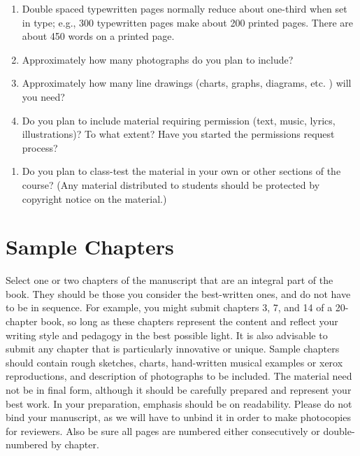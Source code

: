 \documentclass[10pt,dvipsnames,enabledeprecatedfontcommands]{scrartcl}
\providecommand{\tightlist}{%
  \setlength{\itemsep}{0pt}\setlength{\parskip}{0pt}}
\begin{document}
\begin{enumerate}
\def\labelenumi{\alph{enumi}.}
\item
  Double spaced typewritten pages normally reduce about one-third when
  set in type; e.g., 300 typewritten pages make about 200 printed pages.
  There are about 450 words on a printed page.
\item
  Approximately how many photographs do you plan to include?
\item
  Approximately how many line drawings (charts, graphs, diagrams, etc. )
  will you need?
\item
  Do you plan to include material requiring permission (text, music,
  lyrics, illustrations)? To what extent? Have you started the
  permissions request process?
\end{enumerate}

\begin{enumerate}
\def\labelenumi{\arabic{enumi}.}
\setcounter{enumi}{2}
\tightlist
\item
  Do you plan to class-test the material in your own or other sections
  of the course? (Any material distributed to students should be
  protected by copyright notice on the material.)
\end{enumerate}

\hypertarget{sample-chapters}{%
\section{Sample Chapters}\label{sample-chapters}}

Select one or two chapters of the manuscript that are an integral part
of the book. They should be those you consider the best-written ones,
and do not have to be in sequence. For example, you might submit
chapters 3, 7, and 14 of a 20-chapter book, so long as these chapters
represent the content and reflect your writing style and pedagogy in the
best possible light. It is also advisable to submit any chapter that is
particularly innovative or unique. Sample chapters should contain rough
sketches, charts, hand-written musical examples or xerox reproductions,
and description of photographs to be included. The material need not be
in final form, although it should be carefully prepared and represent
your best work. In your preparation, emphasis should be on readability.
Please do not bind your manuscript, as we will have to unbind it in
order to make photocopies for reviewers. Also be sure all pages are
numbered either consecutively or double-numbered by chapter.
\end{document}
